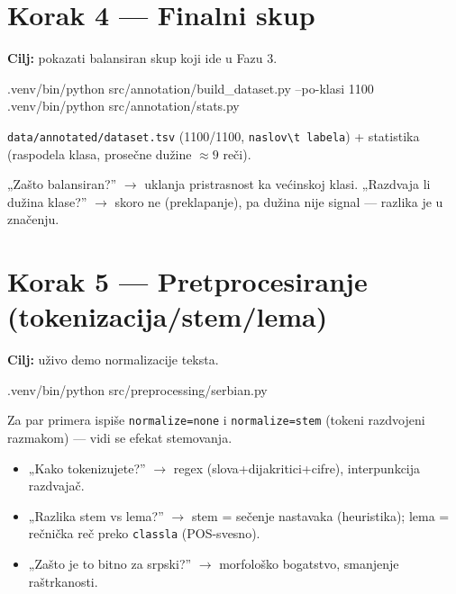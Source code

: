 \documentclass[11pt,a4paper]{article}
\newcommand{\kod}[1]{\texttt{#1}}
\begin{document}
\section{Korak 4 --- Finalni skup}
\textbf{Cilj:} pokazati balansiran skup koji ide u Fazu 3.
\begin{cmd}
.venv/bin/python src/annotation/build_dataset.py --po-klasi 1100
.venv/bin/python src/annotation/stats.py
\end{cmd}
\begin{izlaz}
\kod{data/annotated/dataset.tsv} (1100/1100, \kod{naslov\textbackslash t labela}) +
statistika (raspodela klasa, prosečne dužine ${\approx}9$ reči).
\end{izlaz}
\begin{pita}
„Zašto balansiran?'' $\to$ uklanja pristrasnost ka većinskoj klasi.\quad
„Razdvaja li dužina klase?'' $\to$ skoro ne (preklapanje), pa dužina nije signal ---
razlika je u značenju.
\end{pita}

\section{Korak 5 --- Pretprocesiranje (tokenizacija/stem/lema)}
\textbf{Cilj:} uživo demo normalizacije teksta.
\begin{cmd}
.venv/bin/python src/preprocessing/serbian.py
\end{cmd}
\begin{izlaz}
Za par primera ispiše \kod{normalize=none} i \kod{normalize=stem} (tokeni razdvojeni
razmakom) --- vidi se efekat stemovanja.
\end{izlaz}
\begin{pita}
\begin{itemize}[nosep]
  \item „Kako tokenizujete?'' $\to$ regex (slova+dijakritici+cifre), interpunkcija
    razdvajač.
  \item „Razlika stem vs lema?'' $\to$ stem = sečenje nastavaka (heuristika); lema =
    rečnička reč preko \kod{classla} (POS-svesno).
  \item „Zašto je to bitno za srpski?'' $\to$ morfološko bogatstvo, smanjenje
    raštrkanosti.
\end{itemize}
\end{pita}

\end{document}
